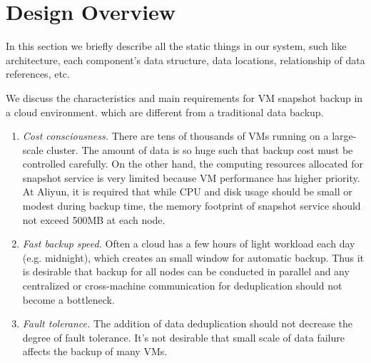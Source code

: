 \section{Design Overview}
In this section we briefly describe all the static things in our system, such like architecture, each component’s data structure, data locations, relationship of data references, etc.

We discuss the characteristics and 
main requirements for VM snapshot backup in a cloud environment.
which are different from a traditional data backup. 

\begin{enumerate}
\item {\em Cost consciousness.}
There are tens of thousands of VMs running on a large-scale cluster. 
The amount of data is so huge such that backup cost must be controlled carefully.
On the other hand, the computing resources allocated for snapshot service is very limited
because VM performance has higher priority.  
At Aliyun, it is required that while CPU and disk usage should be small or modest during backup time,
the memory footprint of snapshot service should not exceed 500MB at each node.

\item {\em Fast backup speed.}
Often a cloud has a few hours of light workload each day (e.g. midnight),  which creates an small window for automatic backup.
Thus it is desirable that backup for all nodes
can be conducted in parallel and any centralized or cross-machine communication for
deduplication should not become a bottleneck.

\item {\em Fault tolerance.}
The addition of data deduplication should not decrease the degree of
fault tolerance. It's not desirable that small scale of data failure affects the backup of many VMs.
\end{enumerate}

